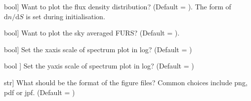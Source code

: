 \documentclass[letterpaper,10pt,english]{sphinxmanual}
\begin{document}
\begin{fulllineitems}
\begin{fulllineitems}
\begin{description}
\sphinxlineitem{dndS}{[}bool{]}
\sphinxAtStartPar
Want to plot the flux density distribution? (Default = ). The form of \(\mathrm{d}n/\mathrm{d}S\) is set during initialisation.

\sphinxlineitem{spectrum}{[}bool{]}
\sphinxAtStartPar
Want to plot the sky averaged FURS? (Default = ).

\sphinxlineitem{xlog}{[}bool{]}
\sphinxAtStartPar
Set the x\sphinxhyphen{}axis scale of spectrum plot in log? (Default = )

\sphinxlineitem{ylog}{[}bool {]}
\sphinxAtStartPar
Set the y\sphinxhyphen{}axis scale of spectrum plot in log? (Default = )

\sphinxlineitem{fig\_ext}{[}str{]}
\sphinxAtStartPar
What should be the format of the figure files? Common choices include png, pdf or jpf. (Default = )

\end{description}

\end{fulllineitems}


\end{fulllineitems}



\renewcommand{\indexname}{Python Module Index}
\begin{sphinxtheindex}
\let\bigletter\sphinxstyleindexlettergroup
\bigletter{f}
\item\relax{}
\end{sphinxtheindex}

\renewcommand{\indexname}{Index}
\printindex
\end{document}
